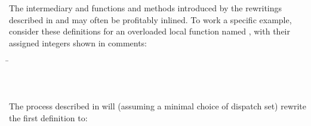 The intermediary  and  functions and methods
introduced by the rewritings described in 
and  may often be profitably inlined.
To work a specific example, consider these definitions for an overloaded local
function named , with their assigned integers shown in comments:
\begin{codeexamplesize}
\begin{tabbing}
\= \\
\> \\
\> \\
\>
\end{tabbing}
\end{codeexamplesize}
The process described in  will
(assuming a minimal choice of dispatch set) rewrite the first definition to:

